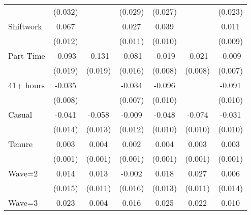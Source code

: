 {\begin{tabular}{l*{6}{c}}
                    &     (0.032)         &                     &     (0.029)         &     (0.027)         &                     &     (0.023)         \\
Shiftwork           &       0.067\sym{***}&                     &       0.027\sym{**} &       0.039\sym{***}&                     &       0.011         \\
                    &     (0.012)         &                     &     (0.011)         &     (0.010)         &                     &     (0.009)         \\
Part Time           &      -0.093\sym{***}&      -0.131\sym{***}&      -0.081\sym{***}&      -0.019\sym{**} &      -0.021\sym{***}&      -0.009         \\
                    &     (0.019)         &     (0.019)         &     (0.016)         &     (0.008)         &     (0.008)         &     (0.007)         \\
41+ hours           &      -0.035\sym{***}&                     &      -0.034\sym{***}&      -0.096\sym{***}&                     &      -0.091\sym{***}\\
                    &     (0.008)         &                     &     (0.007)         &     (0.010)         &                     &     (0.010)         \\
Casual              &      -0.041\sym{***}&      -0.058\sym{***}&      -0.009         &      -0.048\sym{***}&      -0.074\sym{***}&      -0.031\sym{***}\\
                    &     (0.014)         &     (0.013)         &     (0.012)         &     (0.010)         &     (0.010)         &     (0.010)         \\
Tenure              &       0.003\sym{***}&       0.004\sym{***}&       0.002\sym{***}&       0.004\sym{***}&       0.003\sym{***}&       0.003\sym{***}\\
                    &     (0.001)         &     (0.001)         &     (0.001)         &     (0.001)         &     (0.001)         &     (0.001)         \\
Wave=2              &       0.014         &       0.013         &      -0.002         &       0.018         &       0.027\sym{**} &       0.006         \\
                    &     (0.015)         &     (0.011)         &     (0.016)         &     (0.013)         &     (0.011)         &     (0.014)         \\
Wave=3              &       0.023         &       0.004         &       0.016         &       0.025\sym{*}  &       0.022\sym{*}  &       0.010         \\

\end{tabular}}
